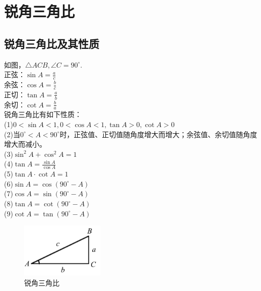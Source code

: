 \documentclass{ecnuthesis}
\begin{document}
\chapter{锐角三角比}
\section{锐角三角比及其性质}
\begin{knowledge}
    如图，$\triangle ACB,\angle C=90^\circ$. \\
    正弦：$\sin A=\frac{a}{c}$ \\
    余弦：$\cos A=\frac{b}{c}$ \\
    正切：$\tan A=\frac{a}{b}$ \\
    余切：$\cot A=\frac{b}{a}$ \\
    锐角三角比有如下性质：\\
    (1)$0 < \sin A < 1, 0 < \cos A < 1, \tan A > 0, \cot A > 0$ \\
    (2)当$0^\circ < A < 90^\circ$时，正弦值、正切值随角度增大而增大；余弦值、余切值随角度增大而减小。\\
    (3)$\sin^2 A+\cos^2 A=1$ \\
    (4)$\tan A=\frac{\sin A}{\cos A}$ \\
    (5)$\tan A·\cot A=1$ \\
    (6)$\sin A=\cos(90^\circ-A)$ \\
    (7)$\cos A=\sin(90^\circ-A)$ \\
    (8)$\tan A=\cot(90^\circ-A)$ \\
    (9)$\cot A=\tan(90^\circ-A)$ \\
\end{knowledge}
\begin{figure}[H]
\centering
\includegraphics[width=4cm]{picture/901.png}
\caption{锐角三角比}
\end{figure}
\clearpage
\end{document}
